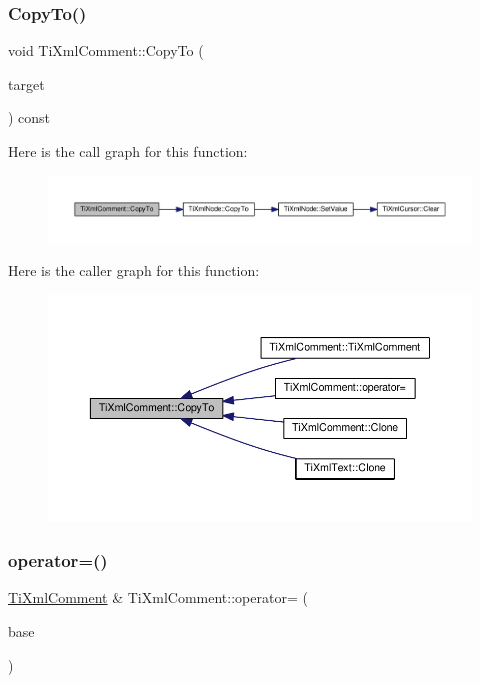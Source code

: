 \subsubsection{\texorpdfstring{Copy\+To()}{CopyTo()}}
{\footnotesize\ttfamily void Ti\+Xml\+Comment\+::\+Copy\+To (\begin{DoxyParamCaption}\item[{\hyperlink{class_ti_xml_comment}{Ti\+Xml\+Comment} $\ast$}]{target }\end{DoxyParamCaption}) const\hspace{0.3cm}{\ttfamily [protected]}}

Here is the call graph for this function\+:
\nopagebreak
\begin{figure}[H]
\begin{center}
\leavevmode
\includegraphics[width=350pt]{class_ti_xml_comment_aaeb8a0b2d503f603879a2d04ceb54295_cgraph}
\end{center}
\end{figure}
Here is the caller graph for this function\+:
\nopagebreak
\begin{figure}[H]
\begin{center}
\leavevmode
\includegraphics[width=350pt]{class_ti_xml_comment_aaeb8a0b2d503f603879a2d04ceb54295_icgraph}
\end{center}
\end{figure}
\mbox{\label{class_ti_xml_comment_aeceedc15f8b8f9ca0b6136696339b3ac}} 
\subsubsection{\texorpdfstring{operator=()}{operator=()}}
{\footnotesize\ttfamily \hyperlink{class_ti_xml_comment}{Ti\+Xml\+Comment} \& Ti\+Xml\+Comment\+::operator= (\begin{DoxyParamCaption}\item[{const \hyperlink{class_ti_xml_comment}{Ti\+Xml\+Comment} \&}]{base }\end{DoxyParamCaption})}

